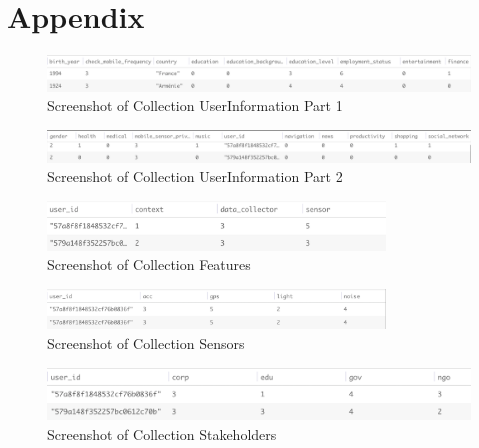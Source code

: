 \chapter{Appendix}

\begin{figure}[ht!]
\centering
\includegraphics[width=\textwidth,keepaspectratio]{./images/collection_ui_1}
\caption{Screenshot of Collection UserInformation Part 1}
\label{fig:col_ui_1}
\end{figure}

\begin{figure}[ht!]
\centering
\includegraphics[width=\textwidth,keepaspectratio]{./images/collection_ui_2}
\caption{Screenshot of Collection UserInformation Part 2}
\label{fig:col_ui_2}
\end{figure}

\begin{figure}[ht!]
\centering
\includegraphics[width=0.8\textwidth,keepaspectratio]{./images/collection_feature_cat}
\caption{Screenshot of Collection Features}
\label{fig:col_f}
\end{figure}

\begin{figure}[ht!]
\centering
\includegraphics[width=0.8\textwidth,keepaspectratio]{./images/collection_sensors_cat}
\caption{Screenshot of Collection Sensors}
\label{fig:col_s}
\end{figure}

\begin{figure}[ht!]
\centering
\includegraphics[width=\textwidth,keepaspectratio]{./images/collection_dc_cat}
\caption{Screenshot of Collection Stakeholders}
\label{fig:col_ss}
\end{figure}

